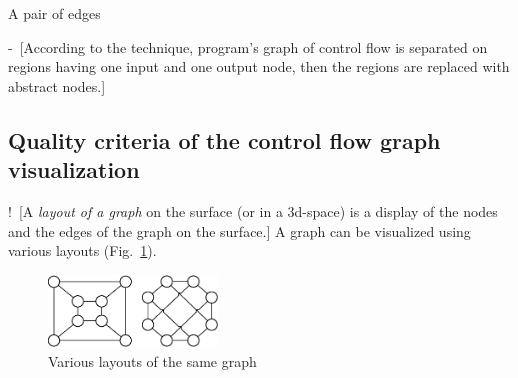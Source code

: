 \documentclass[conference]{IEEEtran}
\newcommand{\rrr}[2][rcolor]{\noindent%
\textcolor{eclr}{-\ [}\textcolor{#1}{#2}\textcolor{eclr}{]}}
\newcommand{\nnn}[2][ncolor]{\noindent%
\textcolor{eclr}{!\ [}\textcolor{#1}{#2}\textcolor{eclr}{]}}
\begin{document}
A pair of edges

\rrr{According to the technique, program's graph of control flow is separated  on regions having one input and one output node, then the regions are replaced with abstract nodes.}

\subsection{Quality criteria of the control flow graph visualization}

\nnn{A \emph{layout of a graph} on the surface (or in a 3d-space) is a display of the nodes and the edges of the graph on the surface.} A graph can be visualized using various layouts (Fig.~\ref{fig:VisExample}).

\begin{figure}[htbp]
	\centering
		\includegraphics[width=0.4\textwidth]{Pic/Pic1.eps}
	\caption{Various layouts of the same graph}
	\label{fig:VisExample}
\end{figure}
\end{document}
